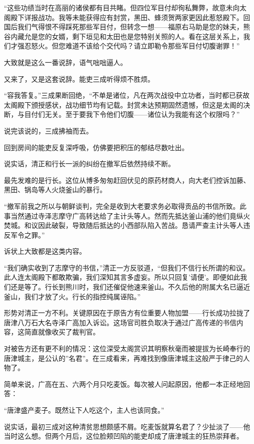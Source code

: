 \documentclass[
]{book}
\begin{document}
``这些功绩当时在高丽的诸侯都有目共睹。但四位军目付却徇私舞弊，故意未向太阁殿下详报战功。我等未能获得应有封赏，黑田、蜂须贺两家更因此惹怒殿下。回国后我们气得恨不得踩死那些军目付，但转念一想------福原右马助是您的妹夫，熊谷内藏允是您的女婿，剩下垣见和太田也是您特别关照的人。看在这层关系上，我们才强忍怒火。但您难道不该给个交代吗？请立即勒令那些军目付切腹谢罪！''

大致就是这么一番说辞，语气咄咄逼人。

又来了，又是这套说辞。能吏三成听得烦不胜烦。

``容我答复。''三成果断回绝，``不单是诸位，凡在两次战役中立功者，当时都已获故太阁殿下颁授感状，战功细节均有记载。封赏未达预期固然遗憾，但这是太阁的决断，与目付们无关。至于要我下令他们切腹------诸位认为我能有这个权限吗？''

说完该说的，三成拂袖而去。

回到房间的能吏反复深呼吸，仿佛要把积压的郁结尽数吐出。

说实话，清正和行长一派的纠纷在撤军后依然持续不断。

最先发难的是行长。这位从博多匆匆赶回伏见的原药材商人，向大老们控诉加藤、黑田、锅岛等人火烧釜山的暴行。

``撤军前我之所以与朝鲜谈判，完全是收到大老要求务必取得贡品的书信所致。此事当然通过寺泽志摩守广高转达给了主计头等人。然而先抵达釜山浦的他们竟纵火焚城。和议因此破裂，导致随后抵达的小西部队陷入苦战。恳请严查主计头等人违反军令之罪。''

诉状上大致都是这类内容。

``我们确实收到了志摩守的书信，''清正一方反驳道，``但我们不信行长所谓的和议。此人连太阁殿下都敢欺骗，我们深知其言多虚妄。所以只回复'请便'。即便如此我们还是等了。行长到熊川时，我们还催促他速来釜山。不久后他的附属大名已逼近釜山，我们才放了火。行长的指控纯属诬陷。''

形势对清正一方不利。关键原因在于原告方有位重要人物加盟------行长成功拉拢了唐津八万石大名寺泽广高加入诉讼。这场官司胜负取决于通过广高传递的书信内容，这简直就像收买了裁判官。

对被告方还有更不利的情况：这位深受太阁赏识其明察秋毫而被提拔为长崎奉行的唐津城主，是公认的''名君''。在三成看来，再难找到像唐津城主这般严于律己的人物了。

简单来说，广高在五、六两个月只吃麦饭。每次被人问起原因，他都一本正经地回答：

``唐津盛产麦子。既然让下人吃这个，主人也该同食。''

说实话，最初三成对这种清贫思想颇感不屑。吃麦饭就算名君了？少扯淡了------他当时这么想。但两个月后，这位脸颊凹陷的能吏却成了唐津城主的狂热崇拜者。
\end{document}
